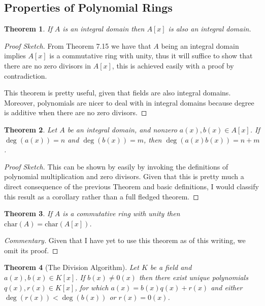 \documentclass[letterpaper, 12pt]{article}
\renewcommand{\char}[1]{\text{char}(#1)}
\newtheorem{thm}{Theorem}
\begin{document}
		\subsection{Properties of Polynomial Rings}
		\label{sub:properties_of_polynomial_rings}
			\setcounter{thm}{16}
			\begin{thm}
			If $A$ is an integral domain then $A[x]$ is also an integral domain.
			\end{thm}
			\color{blue}
			\begin{proof}[Proof Sketch]
			From Theorem 7.15 we have that $A$ being an integral domain implies $A[x]$ is a commutative ring with unity, thus it will suffice to show that there are no zero divisors in $A[x]$, this is achieved easily with a proof by contradiction.

			This theorem is pretty useful, given that fields are also integral domains.
			Moreover, polynomials are nicer to deal with in integral domains because degree is additive when there are no zero divisors.
			\end{proof}
			\color{black}

			\setcounter{thm}{19}
			\begin{thm}
			Let $A$ be an \textit{integral domain}, and nonzero $a(x), b(x) \in A[x]$. 
			If $\deg(a(x)) = n$ and $\deg(b(x)) = m$, then $\deg(a(x)b(x)) = n + m$.
			\end{thm}
			\color{blue}
			\begin{proof}[Proof Sketch]
			This can be shown by easily by invoking the definitions of polynomial multiplication and zero divisors.
			Given that this is pretty much a direct consequence of the previous Theorem and basic definitions, I would classify this result as a corollary rather than a full fledged theorem.
			\end{proof}
			\color{black}

			\setcounter{thm}{21}
			\begin{thm}
			If $A$ is a commutative ring with unity then $\char{A} = \char{A[x]}$.
			\end{thm}
			\color{blue}
			\begin{proof}[Commentary]
			Given that I have yet to use this theorem as of this writing, we omit its proof.
			\end{proof}
			\color{black}

			\setcounter{thm}{23}
			\begin{thm}[The Division Algorithm]
			Let $K$ be a field and $a(x),b(x) \in K[x]$. 
			If $b(x) \neq 0(x)$ then there exist unique polynomials $q(x),r(x) \in K[x]$, for which $a(x) = b(x)q(x) + r(x)$ and either $\deg(r(x)) < \deg(b(x))$ or $r(x) = 0(x)$.
			\end{thm}
\end{document}
